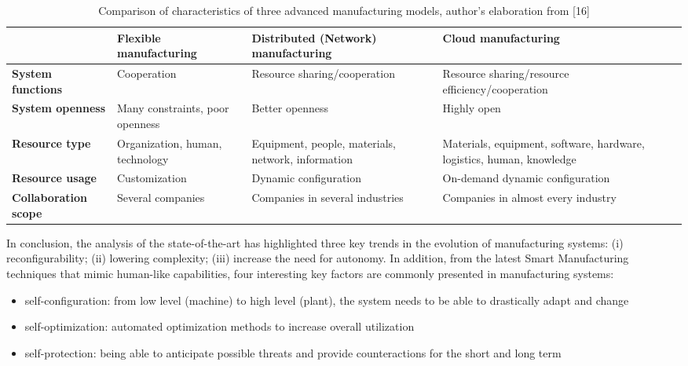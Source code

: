\begin{table}
    \centering
    \begin{tabular}{|p{2cm}|p{2cm}|p{3cm}|p{3cm}|}
        \hline
         & \textbf{Flexible manufacturing} & \textbf{Distributed (Network) manufacturing} & \textbf{Cloud manufacturing}\\
         \hline
         \textbf{System functions} & Cooperation & Resource sharing/cooperation  & Resource sharing/resource efficiency/cooperation \\
         \hline
         \textbf{System openness} & Many constraints, poor openness & Better openness & Highly open \\
         \hline
         \textbf{Resource type} & Organization, human, technology & Equipment, people, materials, network, information & Materials, equipment, software, hardware, logistics, human, knowledge \\
         \hline
         \textbf{Resource usage} & Customization & Dynamic configuration & On-demand dynamic configuration \\
         \hline
         \textbf{Collaboration scope} & Several companies & Companies in several industries & Companies in almost every industry \\
        \hline
    \end{tabular}
    \caption{Comparison of characteristics of three advanced manufacturing models, author’s elaboration from [16]}
    \label{tab:comp-adv-mfg-models}
\end{table}

In conclusion, the analysis of the state-of-the-art has highlighted three key trends in the evolution of manufacturing systems: (i) reconfigurability; (ii) lowering complexity; (iii) increase the need for autonomy. In addition, from the latest Smart Manufacturing techniques that mimic human-like capabilities, four interesting key factors are commonly presented in manufacturing systems:
\begin{itemize}
    \item self-configuration: from low level (machine) to high level (plant), the system needs to be able to drastically adapt and change
    \item self-optimization: automated optimization methods to increase overall utilization
    \item self-protection: being able to anticipate possible threats and provide counteractions for the short and long term
\end{itemize}

